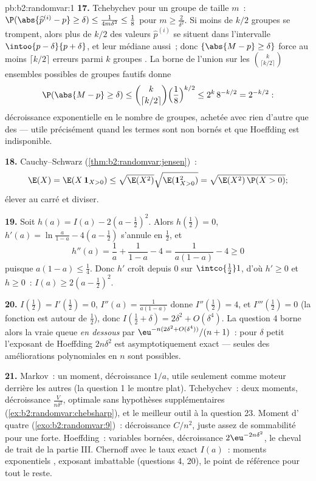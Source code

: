 \begin{solution}{pb:b2:randomvar:1}
\textbf{17.} Tchebychev pour un groupe de taille $m$~: $\P(\abs{
\widehat p^{(i)} - p} \geq \delta) \leq \frac{1}{4m\delta^2}
\leq \frac18$ pour $m \geq \frac2{\delta^2}$. Si moins de
$k/2$ groupes se trompent, alors plus de $k/2$ des valeurs
$\widehat p^{(i)}$ se situent dans l'intervalle  $\intoo{p -
\delta}{p + \delta}$, et leur médiane aussi~; donc
$\{\abs{M - p} \geq \delta\}$ force au moins $\lceil
k/2\rceil$ erreurs parmi $k$ groupes . La borne de l'union
sur les $\binom k{\lceil k/2\rceil}$ ensembles possibles de
groupes fautifs donne
\[
\P(\abs{M - p} \geq \delta)
\leq \binom{k}{\lceil k/2\rceil}
\Bigl(\frac18\Bigr)^{k/2}
\leq 2^k\,8^{-k/2} = 2^{-k/2} :
\]
décroissance exponentielle en le nombre de groupes, achetée avec
rien d'autre que des  --- utile précisément quand les termes
sont non bornés et que Hoeffding est indisponible.

\textbf{18.} Cauchy--Schwarz
(\cref{thm:b2:randomvar:jensen})~:
\[
\E(X) = \E(X\,\mathbf 1_{X>0})
\leq \sqrt{\E(X^2)}\sqrt{\E(\mathbf 1_{X>0}^2)}
= \sqrt{\E(X^2)\,\P(X > 0)} ;
\]
élever au carré et diviser.

\textbf{19.} Soit $h(a) = I(a) - 2(a - \tfrac12)^2$. Alors
$h(\tfrac12) = 0$, $h'(a) = \ln\frac a{1-a} - 4(a -
\tfrac12)$ s'annule en $\tfrac12$, et
\[
h''(a) = \frac1a + \frac1{1-a} - 4 = \frac{1}{a(1-a)} - 4
\geq 0
\]
puisque $a(1-a) \leq \frac14$. Donc $h'$ croît depuis $0$ sur
$\intco{\frac12}1$, d'où $h' \geq 0$ et $h \geq 0$~: $I(a)
\geq 2(a - \tfrac12)^2$.

\textbf{20.} $I(\tfrac12) = I'(\tfrac12) = 0$, $I''(a) =
\frac1{a(1-a)}$ donne $I''(\tfrac12) = 4$, et $I'''(\tfrac12)
= 0$ (la fonction est  autour de $\tfrac12$), donc
$I(\tfrac12 + \delta) = 2\delta^2 + O(\delta^4)$. La question 4
borne alors la vraie queue \emph{en dessous} par
$\eu^{-n(2\delta^2 + O(\delta^4))}/(n+1)$~: pour $\delta$ petit
l'exposant de Hoeffding $2n\delta^2$ est asymptotiquement exact
--- seules des améliorations polynomiales en $n$ sont possibles.

\textbf{21.} Markov~: un moment, décroissance $1/a$, utile seulement comme
moteur derrière les autres (la question 1 le montre plat).
Tchebychev~: deux moments, décroissance $\frac{V}{n\delta^2}$, optimale
sans hypothèses supplémentaires
(\cref{ex:b2:randomvar:chebsharp}), et le meilleur outil à la
question 23. Moment d' quatre (\cref{exo:b2:randomvar:9})~:
décroissance $C/n^2$, juste assez de sommabilité pour une  forte.
Hoeffding~: variables bornées, décroissance $2\eu^{-2n\delta^2}$,
le cheval de trait de la partie III. Chernoff avec le taux exact
$I(a)$~: moments exponentiels , exposant imbattable
(questions 4, 20), le point de référence pour tout le reste.


\end{solution}
